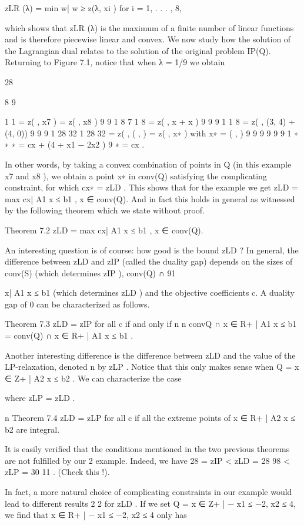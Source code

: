 zLR (λ) = min {w| w ≥ z(λ, xi ) for i = 1, . . . , 8},

which shows that zLR (λ) is the maximum of a finite number of linear functions and is therefore piecewise
linear and convex.
We now study how the solution of the Lagrangian dual relates to the solution of the original problem
IP(Q). Returning to Figure 7.1, notice that when λ = 1/9 we obtain

28

8
9

1
1
= z( , x7 ) = z( , x8 )
9
9
1 8 7 1 8
= z( , x + x )
9 9
9
1
1 8
= z( , (3, 4) + (4, 0))
9 9
9
1 28 32
1
28 32
= z( , ( , ) = z( , x∗ ) with x∗ = ( , )
9 9 9
9
9 9
1
∗
∗
∗
= cx + (4 + x1 − 2x2 )
9
∗
= cx .

In other words, by taking a convex combination of points in Q (in this example x7 and x8 ), we obtain a
point x∗ in conv(Q) satisfying the complicating constraint, for which cx∗ = zLD . This shows that for the
example we get zLD = max {cx| A1 x ≤ b1 , x ∈ conv(Q)}. And in fact this holds in general as witnessed
by the following theorem which we state without proof.

Theorem 7.2
zLD = max {cx| A1 x ≤ b1 , x ∈ conv(Q)}.

An interesting question is of course: how good is the bound zLD ? In general, the difference between
zLD and zIP (called the duality gap) depends on the sizes of conv(S) (which determines zIP ), conv(Q) ∩
91

{x| A1 x ≤ b1 } (which determines zLD ) and the objective coefficients c. A duality gap of 0 can be
characterized as follows.

Theorem 7.3 zLD = zIP for all c if and only if
n
n
conv{Q ∩ {x ∈ R+
| A1 x ≤ b1 }} = conv(Q) ∩ {x ∈ R+
| A1 x ≤ b1 }.

Another interesting difference is the difference between zLD and the value of the LP-relaxation, denoted
n
by zLP . Notice that this only makes sense when Q = {x ∈ Z+
| A2 x ≤ b2 }. We can characterize the case

where zLP = zLD .

n
Theorem 7.4 zLD = zLP for all c if all the extreme points of {x ∈ R+
| A2 x ≤ b2 } are integral.

It is easily verified that the conditions mentioned in the two previous theorems are not fulfilled by our
2
example. Indeed, we have 28 = zIP < zLD = 28 98 < zLP = 30 11
. (Check this !).

In fact, a more natural choice of complicating constraints in our example would lead to different results
2
2
for zLD . If we set Q = {x ∈ Z+
| − x1 ≤ −2, x2 ≤ 4}, we find that {x ∈ R+
| − x1 ≤ −2, x2 ≤ 4} only has


